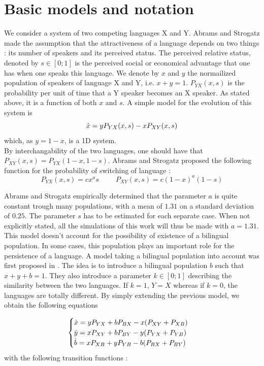 \documentclass{article}
\begin{document}
\section{Basic models and notation}
\label{sec:basic}
We consider a system of two competing languages X and Y.
Abrams and Strogatz made the assumption that the attractiveness of a language depends on two things : its number of speakers and its perceived status.
The perceived relative status, denoted by $s \in [0;1]$ is the perceived social or economical advantage that one has when one speaks this language.
We denote by $x$ and $y$ the normailized population of speakers of language X and Y, i.e. $x+y=1$. $P_{YX}(x, s)$ is the probability per unit of time that a Y speaker becomes an X speaker. As stated above, it is a function of both $x$ and $s$.
A simple model for the evolution of this system is
\begin{equation}
\label{eq:1dsimple}
\dot{x} = yP_{YX}(x, s) - xP_{XY}(x, s)
\end{equation}
which, as $y = 1-x$, is a 1D system. \\
By interchangability of the two languages, one should have that $P_{XY}(x, s) = P_{YX}(1-x, 1-s)$. Abrams and Strogatz proposed the following function for the probability of switching of language :
\[ P_{YX}(x,s) = cx^as \hspace{1cm} P_{XY}(x,s) = c(1-x)^a(1-s) \]

Abrams and Strogatz empirically determined that the parameter $a$ is quite constant trough many populations, with a mean of $1.31$ on a standard deviation of $0.25$. The parameter $s$ has to be estimated for each separate case. When not explicitly stated, all the simulations of this work will thus be made with $a=1.31$.\\

This model doesn't account for the possibility of existence of a bilingual population.
In some cases, this population plays an important role for the persistence of a language.
A model taking a bilingual population into account was first proposed in \cite{BAGGS19939}.
The idea is to introduce a bilingual population $b$ such that $x+y+b=1$.
They also introduce a parameter $k \in [0;1]$ describing the similarity between the two languages.
If $k = 1$, $Y = X$ whereas if $k = 0$, the languages are totally different.
By simply extending the previous model, we obtain the following equations

\begin{equation}
\label{eq:bil}
\begin{cases}
\dot{x} = yP_{YX} + bP_{BX} - x(P_{XY} + P_{XB}) \\
\dot{y} = xP_{XY} + bP_{BY} - y(P_{YX} + P_{YB}) \\
\dot{b} = xP_{XB} + yP_{YB} - b(P_{BX} + P_{BY}) \\
\end{cases}
\end{equation}
with the following transition functions :
\end{document}
